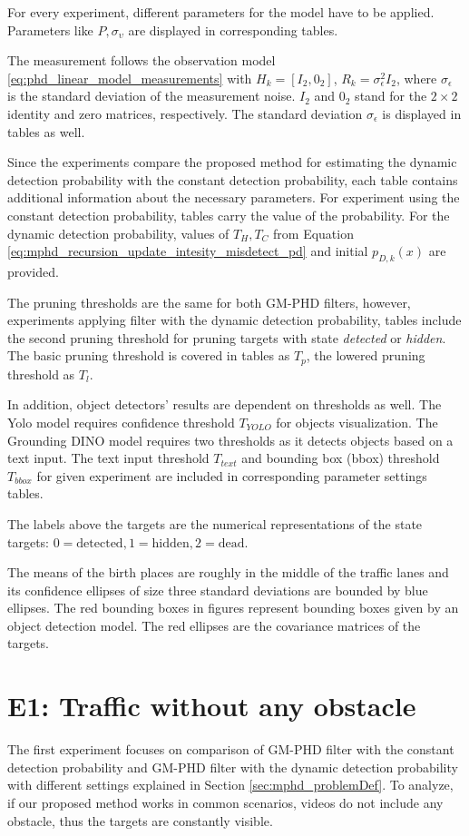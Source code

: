 For every experiment, different parameters for the model have to be applied. Parameters like $P, \sigma_{\upsilon}$
are displayed in corresponding tables.

The measurement follows the observation model \eqref{eq:phd_linear_model_measurements} with $H_k = [I_2, 0_2]$, $R_k
= \sigma_{\epsilon}^2I_2$, where $ \sigma_{\epsilon}$ is the standard deviation of the measurement noise.  $I_2$ and $0_2$ stand for
the $2\times 2$ identity and zero matrices, respectively.
The standard deviation $\sigma_{\epsilon}$ is displayed in tables as well.

Since the experiments compare the proposed method for estimating the dynamic detection probability with the constant
detection probability, each table contains additional information about the necessary parameters. For experiment using the constant
detection probability, tables carry the value of the probability. For the dynamic detection probability, values of $T_H, T_C$
from Equation \eqref{eq:mphd_recursion_update_intesity_misdetect_pd}
and initial $p_{D,k}(x)$ are provided.

The pruning thresholds are the same for both GM-PHD filters, however, experiments applying filter with the dynamic detection probability, tables
include the second pruning threshold for pruning targets with state \textit{detected} or \textit{hidden}. The basic
pruning threshold is covered in tables as $T_p$, the lowered pruning threshold as $T_l$.

In addition, object detectors' results are dependent on thresholds as well. The Yolo model requires confidence threshold $T_{YOLO}$ for objects visualization. The Grounding DINO model requires two thresholds as it detects objects based on a text input. The text input threshold $T_{text}$ and bounding box (bbox) threshold $T_{bbox}$ for given experiment are included in corresponding parameter settings tables.

The labels above
the targets are the numerical representations of the state targets: $0=\text{detected}, 1=\text{hidden}, 2=\text{dead}$.

The means of the birth places are roughly in the middle of the traffic lanes and its confidence ellipses of size three standard
deviations are bounded by blue ellipses. The red bounding boxes in figures represent bounding
boxes given by an object detection model. The red ellipses are the covariance matrices of the targets.


\section{E1: Traffic without any obstacle}
The first experiment focuses on comparison of GM-PHD filter with the constant detection probability and GM-PHD filter
with the dynamic detection probability with different settings explained in Section \ref{sec:mphd_problemDef}. To analyze,
if our proposed method works in common scenarios, videos do not include any obstacle, thus the targets are
constantly visible.















